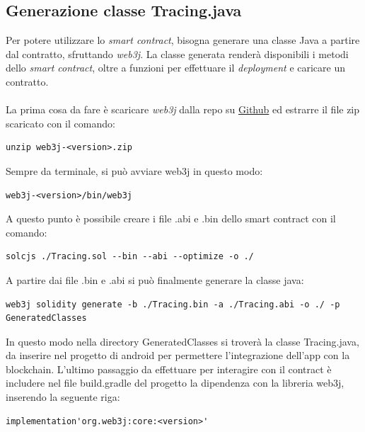 \subsection{Generazione classe Tracing.java}
Per potere utilizzare lo \textit{smart contract}, bisogna generare una classe Java a partire dal contratto, sfruttando \textit{web3j}. La classe generata renderà disponibili i metodi dello \textit{smart contract}, oltre a funzioni per effettuare il \textit{deployment} e caricare un contratto.\\\\
La prima cosa da fare è scaricare \textit{web3j} dalla repo su \href{https://github.com/web3j/web3j/releases}{Github} ed estrarre il file zip scaricato con il comando:
\begin{lstlisting}[numbers=none]
	unzip web3j-<version>.zip
\end{lstlisting}
Sempre da terminale, si può avviare web3j in questo modo:
\begin{lstlisting}[numbers=none]
	web3j-<version>/bin/web3j
\end{lstlisting}
A questo punto è possibile creare i file .abi e .bin dello smart contract con il comando: 
\begin{lstlisting}[numbers=none]
	solcjs ./Tracing.sol --bin --abi --optimize -o ./ 
\end{lstlisting}
A partire dai file .bin e .abi si può finalmente generare la classe java:
\begin{lstlisting}[numbers=none]
	web3j solidity generate -b ./Tracing.bin -a ./Tracing.abi -o ./ -p GeneratedClasses 
\end{lstlisting}
In questo modo nella directory GeneratedClasses si troverà la classe Tracing.java, da inserire nel progetto di android per permettere l'integrazione dell'app con la blockchain.
L'ultimo passaggio da effettuare per interagire con il contract è includere nel file build.gradle del progetto la dipendenza con la libreria web3j, inserendo la seguente riga:
\begin{lstlisting}[numbers=none]
	implementation'org.web3j:core:<version>' 
\end{lstlisting}

